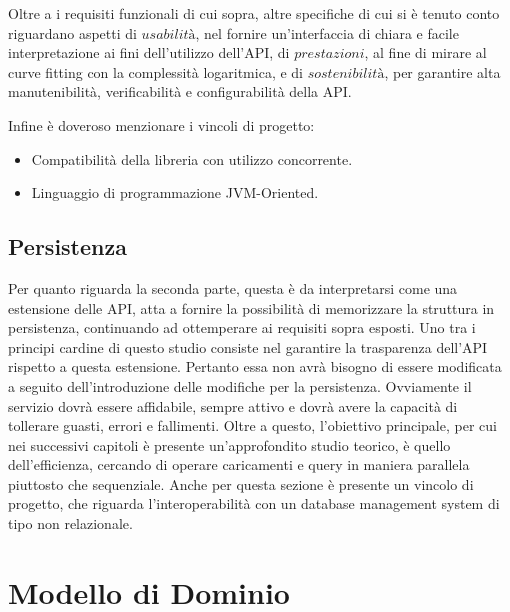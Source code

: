 	Oltre a i requisiti funzionali di cui sopra, altre specifiche di cui si è tenuto conto riguardano aspetti di $ usabilità $, nel fornire un'interfaccia di chiara e facile interpretazione ai fini dell'utilizzo dell'API, di $ prestazioni $, al fine di mirare al curve fitting con la complessità logaritmica, e di $ sostenibilità $, per garantire alta manutenibilità, verificabilità e configurabilità della API.
	
	Infine è doveroso menzionare i vincoli di progetto:
	\begin{itemize}
		\item Compatibilità della libreria con utilizzo concorrente.
		\item Linguaggio di programmazione JVM-Oriented.
	\end{itemize}

	\subsection{Persistenza}
	
	Per quanto riguarda la seconda parte, questa è da interpretarsi come una estensione delle API, atta a fornire la possibilità di memorizzare la struttura in persistenza, continuando ad ottemperare ai requisiti sopra esposti. Uno tra i principi cardine di questo studio consiste nel garantire la trasparenza dell'API rispetto a questa estensione. Pertanto essa non avrà bisogno di essere modificata a seguito dell'introduzione delle modifiche per la persistenza. Ovviamente il servizio dovrà essere affidabile, sempre attivo e dovrà avere la capacità di tollerare guasti, errori e fallimenti.
	Oltre a questo, l'obiettivo principale, per cui nei successivi capitoli è presente un'approfondito studio teorico, è quello dell'efficienza, cercando di operare caricamenti e query in maniera parallela piuttosto che sequenziale.
	Anche per questa sezione è presente un vincolo di progetto, che riguarda l'interoperabilità con un database management system di tipo non relazionale.

\section{Modello di Dominio}

	

